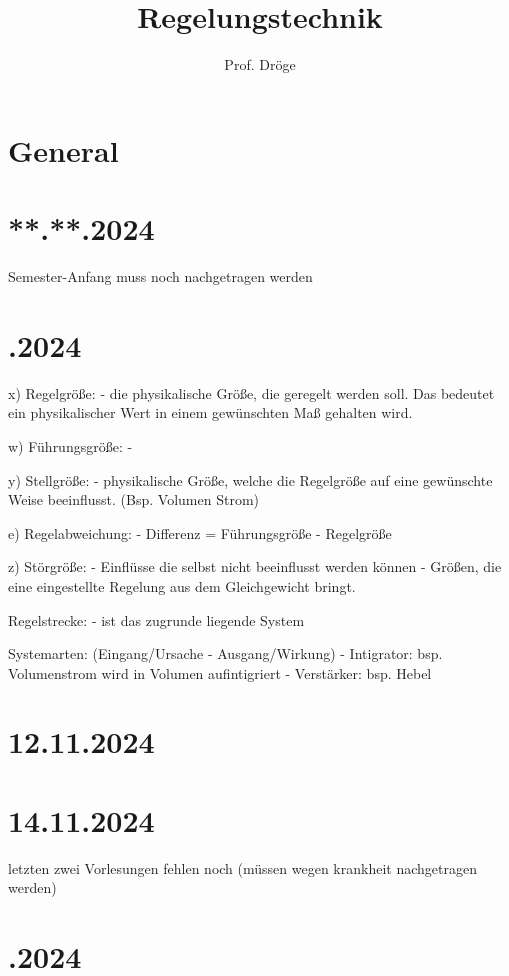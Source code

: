 \documentclass{article}
\title{Regelungstechnik}
\author{Prof. Dröge}
\date{}
\begin{document}
\maketitle

\section*{\centering General}

\newpage
\section*{**.**.2024}
Semester-Anfang muss noch nachgetragen werden

\newpage
 \section*{.2024}

  x) Regelgröße:
  - die physikalische Größe, die geregelt werden soll. Das bedeutet ein physikalischer Wert in einem gewünschten Maß gehalten wird.

  w) Führungsgröße:
  -

  y) Stellgröße:
  - physikalische Größe, welche die Regelgröße auf eine gewünschte Weise beeinflusst. (Bsp. Volumen Strom)

  e) Regelabweichung:
  - Differenz = Führungsgröße - Regelgröße

  z) Störgröße:
  - Einflüsse die selbst nicht beeinflusst werden können
  - Größen, die eine eingestellte Regelung aus dem Gleichgewicht bringt.

  Regelstrecke:
  - ist das zugrunde liegende System

  Systemarten: (Eingang/Ursache - Ausgang/Wirkung)
  - Intigrator: bsp. Volumenstrom wird in Volumen aufintigriert
  - Verstärker: bsp. Hebel

\newpage
\section*{12.11.2024}
\section*{14.11.2024}
letzten zwei Vorlesungen fehlen noch (müssen wegen krankheit nachgetragen werden)

\newpage
\section*{.2024}
\end{document}
